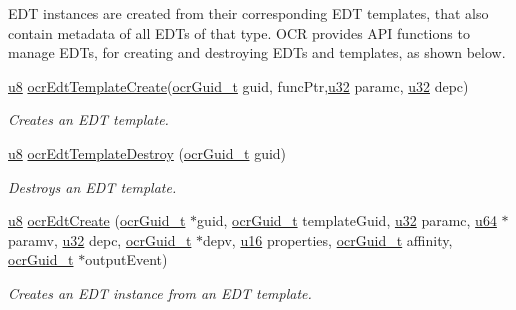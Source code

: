 E\-D\-T instances are created from their corresponding E\-D\-T templates, that also contain metadata of all E\-D\-Ts
of that type. O\-C\-R provides A\-P\-I functions to manage E\-D\-Ts, for creating and destroying E\-D\-Ts and templates, as shown below.
\begin{DoxyCompactItemize}
\item
\hyperlink{group__OCRTypesGeneral_ga92c50087ca0e64fa93fc59402c55f8ca}{u8}
\hyperlink{group__OCREDT_ga9649098ffad669c1c820cd821792d67a}
{ocr\-Edt\-Template\-Create}(\hyperlink{group__OCRTypesGeneral_gacde3883d1ce245c051133c2c3aa82fc8}{ocr\-Guid\-\_\-t} guid, func\-Ptr,\hyperlink{group__OCRTypesGeneral_gafaa62991928fb9fb18ff0db62a040aba}{u32} paramc, \hyperlink{group__OCRTypesGeneral_gafaa62991928fb9fb18ff0db62a040aba}{u32} depc)
\begin{DoxyCompactList}\small\item\em Creates an E\-D\-T template. \end{DoxyCompactList}

\item
\hyperlink{group__OCRTypesGeneral_ga92c50087ca0e64fa93fc59402c55f8ca}{u8} \hyperlink{group__OCREDT_gace7063cfee522df47c64bf5013385c10}
{ocr\-Edt\-Template\-Destroy} (\hyperlink{group__OCRTypesGeneral_gacde3883d1ce245c051133c2c3aa82fc8}{ocr\-Guid\-\_\-t} guid)
\begin{DoxyCompactList}\small\item\em Destroys an E\-D\-T template. \end{DoxyCompactList}

\item
\hyperlink{group__OCRTypesGeneral_ga92c50087ca0e64fa93fc59402c55f8ca}{u8} \hyperlink{group__OCREDT_gafa2443b31c38b4b7f9f59713abe12ecc}
{ocr\-Edt\-Create} (\hyperlink{group__OCRTypesGeneral_gacde3883d1ce245c051133c2c3aa82fc8}{ocr\-Guid\-\_\-t} $\ast$guid, \hyperlink{group__OCRTypesGeneral_gacde3883d1ce245c051133c2c3aa82fc8}{ocr\-Guid\-\_\-t} template\-Guid, \hyperlink{group__OCRTypesGeneral_gafaa62991928fb9fb18ff0db62a040aba}{u32} paramc, \hyperlink{group__OCRTypesGeneral_ga3f7e2bcbb0b4c338f3c4f6c937cd4234}{u64} $\ast$paramv, \hyperlink{group__OCRTypesGeneral_gafaa62991928fb9fb18ff0db62a040aba}{u32} depc, \hyperlink{group__OCRTypesGeneral_gacde3883d1ce245c051133c2c3aa82fc8}{ocr\-Guid\-\_\-t} $\ast$depv, \hyperlink{group__OCRTypesGeneral_gace9d960e74685e2cd84b36132dbbf8aa}{u16} properties, \hyperlink{group__OCRTypesGeneral_gacde3883d1ce245c051133c2c3aa82fc8}{ocr\-Guid\-\_\-t} affinity, \hyperlink{group__OCRTypesGeneral_gacde3883d1ce245c051133c2c3aa82fc8}{ocr\-Guid\-\_\-t} $\ast$output\-Event)
\begin{DoxyCompactList}\small\item\em Creates an E\-D\-T instance from an E\-D\-T template. \end{DoxyCompactList}


\end{DoxyCompactItemize}
